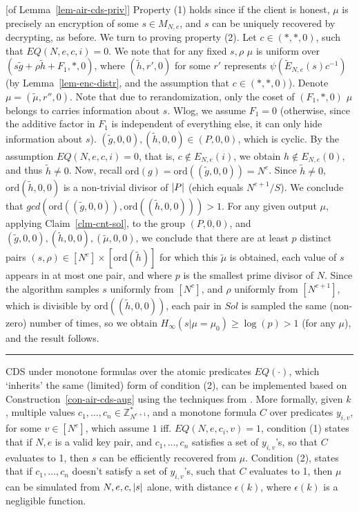 \documentclass[11pt]{article}
\newenvironment{proof}{\noindent {\bf Proof:} \hspace{.677em}}%
                     {\qed}
\newcommand{\qed}{\hspace*{\fill}\rule{0.6em}{0.6em}}
\newcommand{\eps}{{\epsilon}}
\newcommand{\encdj}{{E}_{N,e}}
\newcommand{\encdjnr}{{\tilde{E}}_{N,e}}
\newcommand{\U}[1]{\mathbb{Z}_{#1}^*}
\newcommand{\plain}{{{M}}}
\newcommand{\plaintext}[1]{\plain_{#1}}
\newcommand{\mathify}[1]{\ifmmode{#1}\else\mbox{$#1$}\fi}
\newcommand{\opbrange}[3][,]{#2#1\ldots#1#3}
\newcommand{\size}[1]{\mathify{\left| #1 \right|}}
\newcommand{\order}{{\mathrm{ord}}}
\begin{document}
\begin{proof}[of Lemma~\ref{lem-air-cds-priv}]
Property (1) holds since if the client is honest, $\mu$ is precisely
an encryption of some $s\in\plaintext{N,e}$, and $s$ can be uniquely
recovered by decrypting, as before. We turn to proving property (2).
Let $c\in (*,*,0)$, such that $EQ(N,e,c,i)=0$. We note that for any
fixed $s,\rho$ $\mu$ is uniform over $(s\tilde{g}+\rho \tilde{h} +
F_1,*,0)$, where $(\tilde{h},r',0)$ for some $r'$ represents
$\psi(\encdjnr(s)c^{-1})$ (by Lemma~\ref{lem-enc-distr}, and the
assumption that $c\in(*,*,0)$). Denote $\mu=(\tilde{\mu},r'',0)$.
Note that due to rerandomization, only the coset of $(F_1,*,0)$
$\mu$ belongs to carries information about $s$. Wlog, we assume
$F_1=0$ (otherwise, since the additive factor in $F_1$ is
independent of everything else, it can only hide information about
$s$). $(\tilde{g},0,0),(\tilde{h},0,0)\in(P,0,0)$, which is cyclic.
By the assumption $EQ(N,e,c,i)=0$, that is, $c\notin\encdj(i)$, we
obtain $h\notin\encdj(0)$, and thus $\tilde{h}\neq 0$. Now, recall
$\order(g)=\order((\tilde{g},0,0))=N^e$. Since $\tilde{h}\neq 0$,
$\order(\tilde{h},0,0)$ is a non-trivial divisor of $\size{P}$
(ehich equals $N^{e+1}/S$). We conclude that
$gcd(\order((\tilde{g},0,0)),\order((\tilde{h},0,0)))>1$. For any
given output $\mu$, applying Claim~\ref{clm-cnt-sol}, to the group
$(P,0,0)$, and $(\tilde{g},0,0),(\tilde{h},0,0),(\tilde{\mu},0,0)$,
we conclude that there are at least $p$ distinct pairs
$(s,\rho)\in[N^e]\times[\order(\tilde{h})]$ for which this
$\tilde{\mu}$ is obtained, each value of $s$ appears in at most one
pair, and where $p$ is the smallest prime divisor of $N$. Since the
algorithm samples $s$ uniformly from $[N^e]$, and $\rho$ uniformly
from $[N^{e+1}]$, which is divisible by $\order((\tilde{h},0,0))$,
each pair in $Sol$ is sampled the same (non-zero) number of times,
so we obtain $H_{\infty}(s|\mu=\mu_0)\geq \log(p)>1$ (for any
$\mu$), and the result follows.
\end{proof}

CDS under monotone formulas over the atomic predicates $EQ(\cdot)$, which `inherits' the same (limited) form of condition (2), can be implemented based on Construction~\ref{con-air-cds-aug} using the techniques from \cite{AIR01,GIKM}.
More formally, given $k$, multiple values $\opbrange{c_1}{c_n}\in\U{N^{e+1}}$, and a monotone formula $C$ over predicates $y_{i,v}$, for some $v\in[N^e]$, which assume $1$ iff. $EQ(N,e,c_i,v)=1$, condition (1) states that if $N,e$ is a valid key pair, and $\opbrange{c_1}{c_n}$ satisfies a set of $y_{i,v}$'s, so that $C$ evaluates to 1, then $s$ can be efficiently recovered from $\mu$. Condition (2), states that if $\opbrange{c_1}{c_n}$ doesn't satisfy a set of $y_{i,v}$'s, such that $C$ evaluates to 1, then $\mu$ can be simulated from $N,e,c,\size{s}$ alone, with distance $\eps(k)$, where $\eps(k)$ is a negligible function.
\end{document}
